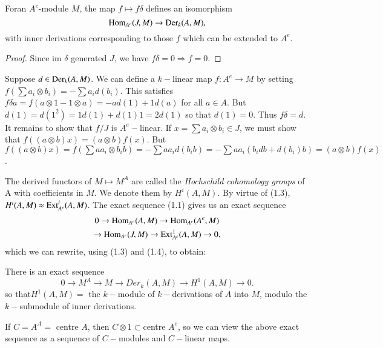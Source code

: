 \setcounter{prop}{3}
\begin{prop}\label{chap3:prop1.4}%
 For\pageoriginale an $A^e$-module $M$, the map $f \mapsto f \delta$
 defines an isomorphism 
$$
\operatorname{Hom}_{A^e} (J,M) \to {\rm Der}_k(A, M),
$$
 with inner derivations corresponding to those $f$ which can be
 extended to $A^e$. 
\end{prop}

\begin{proof}
Since im $\delta$ generated $J$, we have $f \delta = 0 \Rightarrow f =
0$. 
\end{proof}

Suppose $d \in {\rm Der}_k (A, M)$. We can define a $k-$linear map $f : A^e
\to M$ by setting $f (\sum a_i \otimes b_i) = - \sum a_i d(b_i)$. This
satisfies $f \delta a = f(a \otimes 1- 1 \otimes a) = - ad (1) +
1d(a)$ for all $a \in A$. But $d(1) = d(1^2) = 1d(1) + d(1)1 = 2d(1)$
so that $d(1) = 0$. Thus $f \delta = d$. It remains to show that $f/J$
is $A^e-$linear. If $x = \sum a_i \otimes b_i \in J$, we must show
that $f((a \otimes b)x) = (a \otimes b )f(x)$. But $f((a \otimes b)x)
= f(\sum aa_i \otimes b_i b) = - \sum aa_i d(b_i b)= - \sum aa_i (b_i
db + d(b_i)b) = (a \otimes b)f(x)$. 

The derived functors of $M \mapsto M^A$ are called the
\textit{Hochschild cohomology groups} of A with coefficients in
$M$. We denote them by $H^i(A, M)$. By virtue of (1.3), $H^i (A, M)
\approx \operatorname{Ext}^i_{A^e} (A, M)$. The exact sequence (1.1) gives us an
exact sequence 
\begin{gather*}
0 \to \operatorname{Hom}_{A^e} (A, M) \to \operatorname{Hom}_{A^e} (A^e, M)\\ 
\to \operatorname{Hom}_{A^e} (J, M) \to
\operatorname{Ext}^1_{A^e} (A, M) \to 0, 
\end{gather*}
which we can rewrite, using (1.3) and (1.4), to obtain:

\begin{prop}%
There is an exact sequence 
$$
0 \to M^A \to M \to Der_k (A, M) \to H^1 (A, M) \to 0. 
$$
so that\pageoriginale $H^1 (A,M) = $ the $k-$module of $k-$derivations
of $A$ into $M$, modulo the $k-$submodule of inner derivations.  
\end{prop}

If $C = A^A = $ centre $A$, then $C \otimes 1 \subset $centre $A^e$, 
so we can view the above exact sequence as a sequence of $C-$modules 
and $C- $linear maps. 

